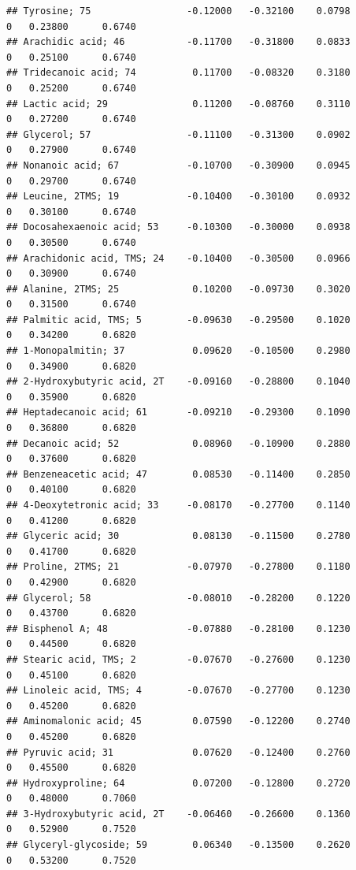 \documentclass[]{article}
\begin{document}
\begin{verbatim}
## Tyrosine; 75                 -0.12000   -0.32100    0.0798         0   0.23800      0.6740
## Arachidic acid; 46           -0.11700   -0.31800    0.0833         0   0.25100      0.6740
## Tridecanoic acid; 74          0.11700   -0.08320    0.3180         0   0.25200      0.6740
## Lactic acid; 29               0.11200   -0.08760    0.3110         0   0.27200      0.6740
## Glycerol; 57                 -0.11100   -0.31300    0.0902         0   0.27900      0.6740
## Nonanoic acid; 67            -0.10700   -0.30900    0.0945         0   0.29700      0.6740
## Leucine, 2TMS; 19            -0.10400   -0.30100    0.0932         0   0.30100      0.6740
## Docosahexaenoic acid; 53     -0.10300   -0.30000    0.0938         0   0.30500      0.6740
## Arachidonic acid, TMS; 24    -0.10400   -0.30500    0.0966         0   0.30900      0.6740
## Alanine, 2TMS; 25             0.10200   -0.09730    0.3020         0   0.31500      0.6740
## Palmitic acid, TMS; 5        -0.09630   -0.29500    0.1020         0   0.34200      0.6820
## 1-Monopalmitin; 37            0.09620   -0.10500    0.2980         0   0.34900      0.6820
## 2-Hydroxybutyric acid, 2T    -0.09160   -0.28800    0.1040         0   0.35900      0.6820
## Heptadecanoic acid; 61       -0.09210   -0.29300    0.1090         0   0.36800      0.6820
## Decanoic acid; 52             0.08960   -0.10900    0.2880         0   0.37600      0.6820
## Benzeneacetic acid; 47        0.08530   -0.11400    0.2850         0   0.40100      0.6820
## 4-Deoxytetronic acid; 33     -0.08170   -0.27700    0.1140         0   0.41200      0.6820
## Glyceric acid; 30             0.08130   -0.11500    0.2780         0   0.41700      0.6820
## Proline, 2TMS; 21            -0.07970   -0.27800    0.1180         0   0.42900      0.6820
## Glycerol; 58                 -0.08010   -0.28200    0.1220         0   0.43700      0.6820
## Bisphenol A; 48              -0.07880   -0.28100    0.1230         0   0.44500      0.6820
## Stearic acid, TMS; 2         -0.07670   -0.27600    0.1230         0   0.45100      0.6820
## Linoleic acid, TMS; 4        -0.07670   -0.27700    0.1230         0   0.45200      0.6820
## Aminomalonic acid; 45         0.07590   -0.12200    0.2740         0   0.45200      0.6820
## Pyruvic acid; 31              0.07620   -0.12400    0.2760         0   0.45500      0.6820
## Hydroxyproline; 64            0.07200   -0.12800    0.2720         0   0.48000      0.7060
## 3-Hydroxybutyric acid, 2T    -0.06460   -0.26600    0.1360         0   0.52900      0.7520
## Glyceryl-glycoside; 59        0.06340   -0.13500    0.2620         0   0.53200      0.7520

\end{verbatim}
\end{document}
